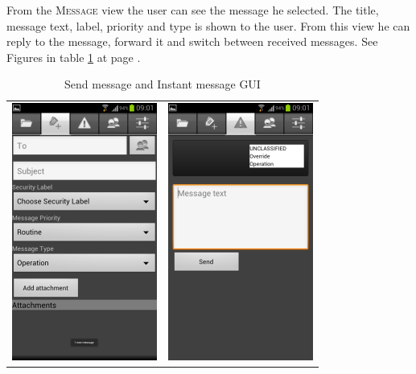 From the \textsc{Message} view the user can see the message he selected. The title, message text, label, priority and type is shown to the user. From this view he can reply to the message, forward it and switch between received messages. See Figures in table \ref{tab:sendinstantmessage} at page \pageref{tab:sendinstantmessage}.
\newline
\begin{table}[h!]
\begin{center}
\begin{tabular}{cc}
\includegraphics{sendmessage} & \includegraphics{instamessage}
\end{tabular}
\caption{Send message and Instant message GUI} \label{tab:sendinstantmessage}
\end{center}
\end{table}

